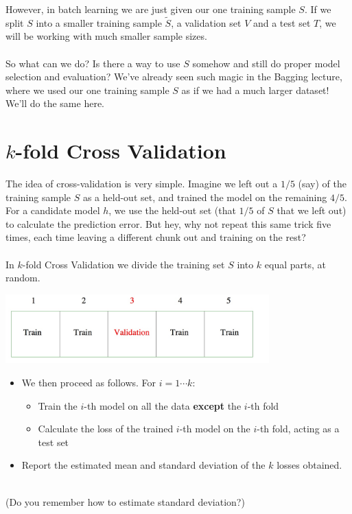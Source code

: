 However, in batch learning we are just given our one training sample $S$. 
If we split $S$ into a smaller training sample $\tilde{S}$, a validation set $V$
and a test set $T$, we will be working with much smaller sample sizes.
\\~\\
So what can we do? Is there a way to use $S$ somehow and still do proper model
selection and evaluation? We've already seen such magic in the Bagging lecture,
where we used our one training sample $S$ as if we had a much larger dataset!
We'll do the same here.

\section{$k$-fold Cross Validation}

The idea of cross-validation is very simple. Imagine we left out a $1/5$ (say)
of the training sample $S$ as a held-out set, and trained the model on the
remaining $4/5$. For a candidate model $h$, we use the held-out set (that $1/5$
of $S$ that we left out) to calculate the prediction error. But hey, why not
repeat this same trick five times, each time leaving a different chunk out and
training on the rest?
\\~\\
In $k$-fold Cross Validation we divide the training set $S$ into $k$ equal
parts, at random. 

\begin{center}
  \includegraphics[width=4in]{cv.jpeg}  
    \end{center}
    \begin{itemize}
      \item We then proceed as follows. For $i=1\cdots k$:
      \begin{itemize}
        \item Train the $i$-th model on all the data {\bf except} the $i$-th fold
        \item Calculate the loss of the trained $i$-th model on the $i$-th fold, acting as a test set
      \end{itemize}
    \item Report the estimated mean and standard deviation of the $k$ losses obtained.
  \end{itemize}
~\\
  (Do you remember how to estimate standard deviation?)


